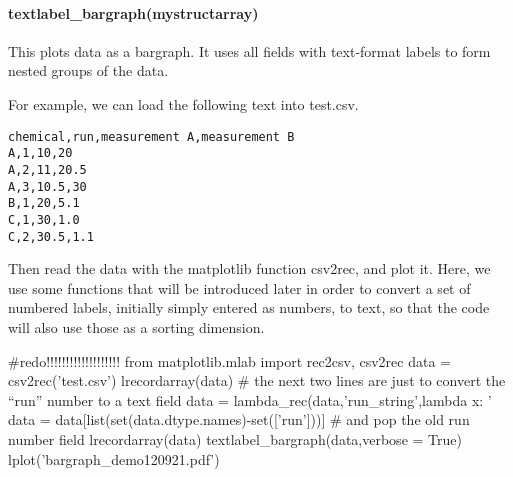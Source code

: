 \paragraph{textlabel\_bargraph(mystructarray)}
This plots data as a bargraph.
It uses all fields with text-format labels to form nested groups of the data.

For example, we can load the following text into test.csv.

\begin{verbatim}
chemical,run,measurement A,measurement B
A,1,10,20
A,2,11,20.5
A,3,10.5,30
B,1,20,5.1
C,1,30,1.0
C,2,30.5,1.1
\end{verbatim}

Then read the data with the matplotlib function csv2rec,
    and plot it.
Here, we use some functions that will be introduced later in order
    to convert a set of numbered labels, initially simply entered as numbers,
    to text, so that the code will also use those as a sorting dimension.

\begin{python}
#redo!!!!!!!!!!!!!!!!!!!
from matplotlib.mlab import rec2csv, csv2rec
data = csv2rec('test.csv')
lrecordarray(data)
# the next two lines are just to convert the ``run'' number to a text field
data = lambda_rec(data,'run_string',lambda x: '%
data = data[list(set(data.dtype.names)-set(['run']))] # and pop the old run number field
lrecordarray(data)
textlabel_bargraph(data,verbose = True)
lplot('bargraph_demo120921.pdf')
\end{python}

